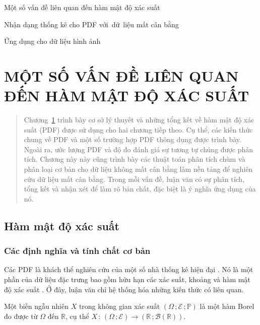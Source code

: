 \documentclass[a4paper,oneside]{book} %
\theoremstyle{plain}
\theoremstyle{plain}
\newcommand{\dng}[1]{\begin{definition}#1\end{definition}}
\theoremstyle{nonumberplain}
\begin{document}
\begin{description}\it
	\item[Chương~\ref{chapter_1}.] Một số vấn đề liên quan đến hàm mật độ xác suất
	\item[Chương~\ref{chapter_2}.] Nhận dạng thống kê cho PDF với~dữ~liệu mất cân bằng
	\item[Chương~\ref{chapter_3}.] Ứng dụng cho dữ liệu hình ảnh
\end{description}


		\chapter{MỘT SỐ VẤN ĐỀ LIÊN QUAN ĐẾN HÀM MẬT ĐỘ XÁC SUẤT}\label{chapter_1}
	
	\begin{quotation}\fontsize{12pt}{14pt}\selectfont
		Chương~\ref{chapter_1} trình bày cơ sở lý thuyết và những tổng kết về hàm mật độ xác suất (PDF) được sử dụng cho hai chương tiếp theo. Cụ thể, các kiến thức chung về PDF và một số trường hợp PDF thông dụng được trình bày. Ngoài ra, ước lượng PDF và độ đo đánh giá sự tương tự chúng
		được phân tích. Chương này này cũng trình bày các thuật toán phân tích chùm và phân loại cơ bản cho dữ liệu không mất cân bằng làm nền tảng để nghiên cứu dữ liệu mất cân bằng. Trong mỗi vấn đề, luận văn có sự phân tích, tổng kết và nhận xét để làm rõ bản chất, đặc biệt là ý nghĩa ứng dụng của nó.
	\end{quotation}
	
\section{Hàm mật độ xác suất}


\subsection{Các định nghĩa và tính chất cơ bản}
Các PDF là khách thể nghiên cứu của một số nhà thống kê hiện đại \cite{Tai2010,billard2012symbolic,irpino2015basic}. Nó là một phần của dữ liệu đặc trưng bao gồm hữu hạn các xác suất, khoảng và hàm mật độ xác suất \cite{billard2012symbolic}. Ở đây, luận văn chỉ hệ thống hóa những kiến thức có liên quan.

\dng{[Biến ngẫu nhiên] Một biến ngẫu nhiên $X$ trong không gian xác suất $(\Omega\,;\mathcal{E}\,;\mathbb{P})$ là một hàm Borel đo được từ $\Omega$ đến $\mathbb{R}$, cụ thể $X\,:\,(\Omega\,;\mathcal{E})\to(\mathbb{R}\,;\mathcal{B}(\mathbb{R}))$.
}
\end{document}
